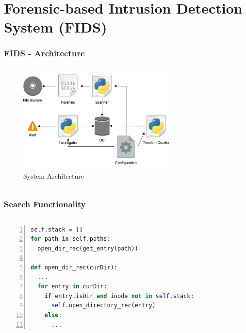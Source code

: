 \documentclass{beamer}
\begin{document}
\section{Forensic-based Intrusion Detection System (FIDS)}


\begin{frame}[fragile]
  \frametitle{FIDS - Architecture}
  \begin{columns}
    \begin{column}{1\textwidth}
      \begin{figure}[ht]
        \includegraphics[width=8cm]{../img/Overview_FIDS.png}
        \centering
        \caption{System Architecture}
        \label{fig:systemArchitecture}
      \end{figure}
    \end{column}
  \end{columns}
\end{frame}

\begin{frame}[fragile]
  \frametitle{Search Functionality}
  \begin{columns}
    \begin{column}{1\textwidth}
      \begin{lstlisting}[language=python, numbers=left]
self.stack = []
for path in self.paths:
  open_dir_rec(get_entry(path))

def open_dir_rec(curDir):
  ...
  for entry in curDir:
    if entry.isDir and inode not in self.stack:
      self.open_directory_rec(entry)
    else:
      ...
      \end{lstlisting}
    \end{column}
  \end{columns}
\end{frame}
\end{document}
